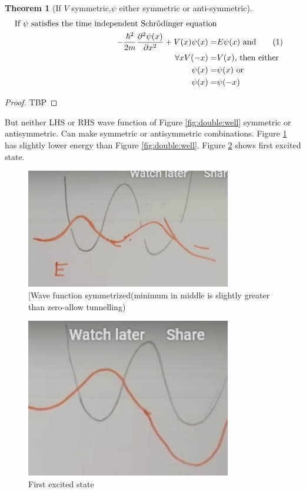 \documentclass[]{article}
\newcommand\numberthis{\addtocounter{equation}{1}\tag{\theequation}}
\newtheorem{thm}{Theorem}
\begin{document}
\begin{thm}[If $V$ symmetric,$\psi$ either symmetric or anti-symmetric]
	\begin{align*}
	\text{If  $\psi$ satisfies the time independent Schr\"odinger equation}\\
	-\frac{\hslash^2}{2m}\frac{\partial^2 \psi(x)}{\partial x^2} + V(x)\psi(x) =& E\psi(x) \text{ and}\numberthis \label{eq:ti:schroedinger}\\
	\forall x V(-x) =& V(x)\text{, then either}\\
	\psi(x) =& \psi(x)\text{ or}\\
	\psi(x) =& \psi(-x)
	\end{align*}
\end{thm}

\begin{proof}
	TBP
\end{proof}

But neither LHS or RHS wave function of Figure \ref{fig:double:well} symmetric or antisymmetric. Can make symmetric or antisymmetric combinations. Figure \ref{fig:double:well:symmetrized} has slightly lower energy than Figure \ref{fig:double:well}. Figure \ref{fig:double:well:1st} shows first excited state.

\begin{figure}[H]
	\caption[Wave function symmetrized]{[Wave function symmetrized(minimum in middle is slightly greater than zero-allow tunnelling)}\label{fig:double:well:symmetrized}
	\includegraphics[width=0.8\textwidth]{particle_mixed_symmetrized}
\end{figure}

\begin{figure}[H]
	\caption{First excited state}\label{fig:double:well:1st}
	\includegraphics[width=0.8\textwidth]{particle_mixed_1st_excited}
\end{figure}
\end{document}
